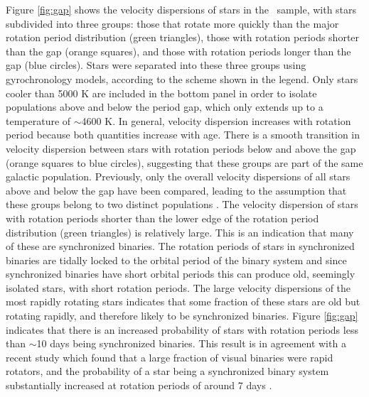Figure \ref{fig:gap} shows the velocity dispersions of stars in the \mct\
sample, with stars subdivided into three groups: those that rotate more
quickly than the major rotation period distribution (green triangles), those
with rotation periods shorter than the gap (orange squares), and those with
rotation periods longer than the gap (blue circles).
Stars were separated into these three groups using \citet{angus2019}
gyrochronology models, according to the scheme shown in the legend.
Only stars cooler than 5000 K are included in the bottom panel in order to
isolate populations above and below the period gap, which only extends up to a
temperature of $\sim$4600 K.
In general, velocity dispersion increases with rotation period because both
quantities increase with age.
There is a smooth transition in velocity dispersion between stars with
rotation periods below and above the gap (orange squares to blue circles),
suggesting that these groups are part of the same galactic population.
Previously, only the overall velocity dispersions of all stars above and below
the gap have been compared, leading to the assumption that these groups belong
to two distinct populations \citep{mcquillan2014}.
The velocity dispersion of stars with rotation periods shorter than the lower
edge of the rotation period distribution (green triangles) is relatively
large.
This is an indication that many of these are synchronized binaries.
The rotation periods of stars in synchronized binaries are tidally locked to
the orbital period of the binary system and since synchronized binaries have
short orbital periods this can produce old, seemingly isolated stars, with
short rotation periods.
The large velocity dispersions of the most rapidly rotating stars indicates
that some fraction of these stars are old but rotating rapidly, and therefore
likely to be synchronized binaries.
Figure \ref{fig:gap} indicates that there is an increased probability of stars
with rotation periods less than $\sim$10 days being synchronized binaries.
This result is in agreement with a recent study which found that a large
fraction of visual binaries were rapid rotators, and the probability of a star
being a synchronized binary system substantially increased at rotation periods
of around 7 days \citep{simonian2019}.



